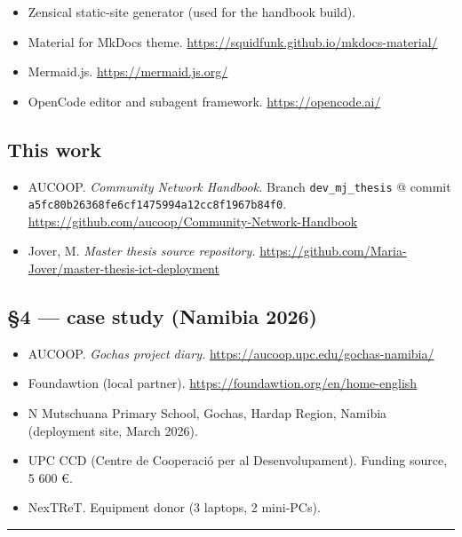 \begin{itemize}
\tightlist
\item
  Zensical static-site generator (used for the handbook build).
\item
  Material for MkDocs theme.
  \url{https://squidfunk.github.io/mkdocs-material/}
\item
  Mermaid.js. \url{https://mermaid.js.org/}
\item
  OpenCode editor and subagent framework. \url{https://opencode.ai/}
\end{itemize}

\hypertarget{this-work}{%
\subsection{This work}\label{this-work}}

\begin{itemize}
\tightlist
\item
  AUCOOP. \emph{Community Network Handbook.} Branch
  \texttt{dev\_mj\_thesis} @ commit
  \texttt{a5fc80b26368fe6cf1475994a12cc8f1967b84f0}.
  \url{https://github.com/aucoop/Community-Network-Handbook}
\item
  Jover, M. \emph{Master thesis source repository.}
  \url{https://github.com/Maria-Jover/master-thesis-ict-deployment}
\end{itemize}

\hypertarget{case-study-namibia-2026}{%
\subsection{§4 --- case study (Namibia
2026)}\label{case-study-namibia-2026}}

\begin{itemize}
\tightlist
\item
  AUCOOP. \emph{Gochas project diary.}
  \url{https://aucoop.upc.edu/gochas-namibia/}
\item
  Foundawtion (local partner).
  \url{https://foundawtion.org/en/home-english}
\item
  N Mutschuana Primary School, Gochas, Hardap Region, Namibia
  (deployment site, March 2026).
\item
  UPC CCD (Centre de Cooperació per al Desenvolupament). Funding source,
  5 600 €.
\item
  NexTReT. Equipment donor (3 laptops, 2 mini-PCs).
\end{itemize}

\begin{center}\rule{0.5\linewidth}{0.5pt}\end{center}

